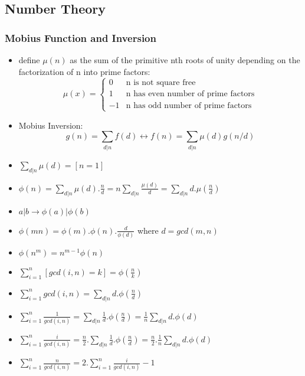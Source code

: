 \subsection{Number Theory}
\vspace{2.5mm}
\subsubsection{Mobius Function and Inversion}
\vspace{2.5mm}
\begin{itemize}
    \item define $\mu(n)$ as the sum of the primitive nth roots of unity depending on the factorization of n into prime factors:
    \[
\mu(x) =
\begin{cases}
0 & \text{n is not square free} \\
1 & \text{n has even number of prime factors}\\
-1 & \text{n has odd number of prime factors}
\end{cases}
\]
\item Mobius Inversion:
$$g(n) = \sum_{d|n}f(d)\leftrightarrow f(n) = \sum_{d|n}\mu(d)g(n/d)$$
\item $\sum\limits_{d|n}\mu(d) = [n=1]$
\item $\phi(n) = \sum\limits_{d|n} \mu(d).\frac{n}{d} = n\sum\limits_{d|n}\frac{\mu(d)}{d} = \sum\limits_{d|n}d.\mu(\frac{n}{d})$
\item $a|b \rightarrow \phi(a)|\phi(b)$
\item $\phi(mn) = \phi(m).\phi(n).\frac{d}{\phi(d)}$ where $d = gcd(m,n)$
\item $\phi(n^m) = n^{m-1}\phi(n)$
\item $\sum\limits_{i=1}^n[gcd(i,n)=k] = \phi(\frac{n}{k})$
\item $\sum\limits_{i=1}^n gcd(i,n) = \sum\limits_{d|n}d.\phi(\frac{n}{d})$

\item $\sum\limits_{i=1}^n \frac{1}{gcd(i,n)} = \sum\limits_{d|n}\frac{1}{d}.\phi(\frac{n}{d}) = \frac{1}{n}\sum\limits_{d|n}d.\phi(d)$

\item $\sum\limits_{i=1}^n \frac{i}{gcd(i,n)} = \frac{n}{2}.\sum\limits_{d|n}\frac{1}{d}.\phi(\frac{n}{d}) = \frac{n}{2}.\frac{1}{n}\sum\limits_{d|n}d.\phi(d)$

\item $\sum\limits_{i=1}^n \frac{n}{gcd(i,n)} = 2.\sum\limits_{i=1}^n \frac{i}{gcd(i,n)} - 1$
\end{itemize}
